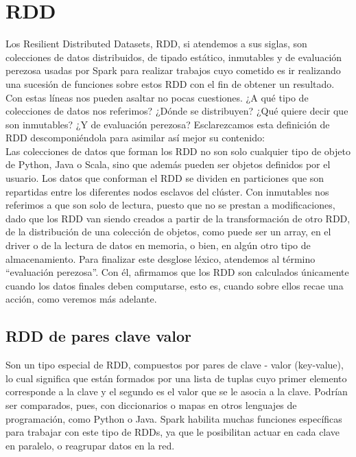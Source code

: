 \chapter{RDD}

Los Resilient Distributed Datasets, RDD, si atendemos a sus siglas, son colecciones de datos distribuidos, de tipado estático, inmutables y de evaluación perezosa usadas por Spark para realizar trabajos cuyo cometido es ir realizando una sucesión de funciones sobre estos RDD con el fin de obtener un resultado.\\
 
Con estas líneas nos pueden asaltar no pocas cuestiones. ¿A qué tipo de colecciones de datos nos referimos? ¿Dónde se distribuyen? ¿Qué quiere decir que son inmutables? ¿Y de evaluación perezosa? Esclarezcamos esta definición de RDD descomponiéndola para asimilar así mejor su contenido:\\
 
Las colecciones de datos que forman los RDD no son solo cualquier tipo de objeto de Python, Java o Scala, sino que  además pueden ser objetos definidos por el usuario. Los datos que conforman el RDD se dividen en particiones que son repartidas entre los diferentes nodos esclavos del clúster. Con inmutables nos referimos a que son solo de lectura, puesto que no se prestan a modificaciones, dado que los RDD van siendo creados a partir de la transformación de otro RDD, de la distribución de una colección de objetos, como puede ser un array, en el driver o de la lectura de datos en memoria, o bien, en algún otro tipo de almacenamiento. Para finalizar este desglose léxico, atendemos al término “evaluación perezosa”. Con él, afirmamos que los RDD son calculados únicamente cuando los datos finales deben computarse, esto es, cuando sobre ellos recae una acción, como veremos más adelante.\\

\section{RDD de pares clave valor}

Son un tipo especial de RDD, compuestos por pares de clave - valor (key-value), lo cual significa que están formados por una lista de tuplas cuyo primer elemento corresponde a la clave y el segundo es el valor que se le asocia a la clave. Podrían ser comparados, pues, con diccionarios o mapas en otros lenguajes de programación, como Python o Java. Spark habilita muchas funciones específicas para trabajar con este tipo de RDDs, ya que le posibilitan actuar en cada clave en paralelo, o reagrupar datos en la red.\\

